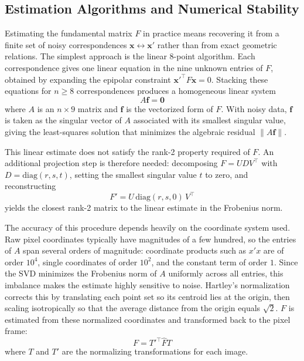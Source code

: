 \subsection{Estimation Algorithms and Numerical Stability}
Estimating the fundamental matrix $F$ in practice means recovering it from a finite set of noisy correspondences $\mathbf{x} \leftrightarrow \mathbf{x}'$ rather than from exact geometric relations. The simplest approach is the linear 8-point algorithm. Each correspondence gives one linear equation in the nine unknown entries of $F$, obtained by expanding the epipolar constraint $\mathbf{x}'^\top F \mathbf{x} = 0$. Stacking these equations for $n \geq 8$ correspondences produces a homogeneous linear system
\begin{equation}
    A\mathbf{f} = \mathbf{0}
\end{equation}
where $A$ is an $n \times 9$ matrix and $\mathbf{f}$ is the vectorized form of $F$. With noisy data, $\mathbf{f}$ is taken as the singular vector of $A$ associated with its smallest singular value, giving the least-squares solution that minimizes the algebraic residual $\|A\mathbf{f}\|$.

This linear estimate does not satisfy the rank-2 property required of $F$. An additional projection step is therefore needed: decomposing $F = UDV^\top$ with $D = \text{diag}(r, s, t)$, setting the smallest singular value $t$ to zero, and reconstructing
\begin{equation}
    F' = U\,\text{diag}(r, s, 0)\,V^\top
\end{equation}
yields the closest rank-2 matrix to the linear estimate in the Frobenius norm.

The accuracy of this procedure depends heavily on the coordinate system used. Raw pixel coordinates typically have magnitudes of a few hundred, so the entries of $A$ span several orders of magnitude: coordinate products such as $x'x$ are of order $10^4$, single coordinates of order $10^2$, and the constant term of order $1$. Since the SVD minimizes the Frobenius norm of $A$ uniformly across all entries, this imbalance makes the estimate highly sensitive to noise. Hartley's normalization corrects this by translating each point set so its centroid lies at the origin, then scaling isotropically so that the average distance from the origin equals $\sqrt{2}$. $F$ is estimated from these normalized coordinates and transformed back to the pixel frame:
\begin{equation}
    F = T'^\top \hat{F} T
\end{equation}
where $T$ and $T'$ are the normalizing transformations for each image.

